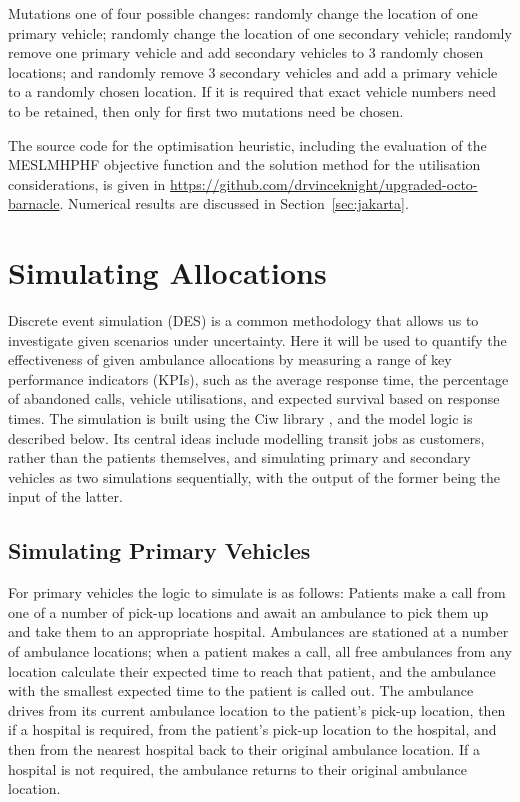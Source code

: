 \documentclass[preprint,12pt]{elsarticle}
\begin{document}
Mutations one of four possible changes: randomly change the location of one
primary vehicle; randomly change the location of one secondary vehicle;
randomly remove one primary vehicle and add secondary vehicles to 3 randomly
chosen locations; and randomly remove 3 secondary vehicles and add a primary
vehicle to a randomly chosen location. If it is required that exact vehicle
numbers need to be retained, then only for first two mutations need be chosen.

The source code for the optimisation heuristic, including the evaluation of
the MESLMHPHF objective function and the solution method for the utilisation
considerations, is given in
\url{https://github.com/drvinceknight/upgraded-octo-barnacle}.
Numerical results are discussed in Section~\ref{sec:jakarta}.




\section{Simulating Allocations}\label{sec:simulation}
Discrete event simulation (DES) is a common methodology that allows us to
investigate given scenarios under uncertainty. Here it will be used to
quantify the effectiveness of given ambulance allocations by measuring a range
of key performance indicators (KPIs), such as the average response time, the
percentage of abandoned calls, vehicle utilisations, and expected survival
based on response times. The simulation is built using the Ciw library
\cite{palmer2019ciw}, and the model logic is described below. Its central
ideas include modelling transit jobs as customers, rather than the patients
themselves, and simulating primary and secondary vehicles as two simulations
sequentially, with the output of the former being the input of the latter.


\subsection{Simulating Primary Vehicles}\label{sec:simulation_primary}
For primary vehicles the logic to simulate is as follows: Patients make a call
from one of a number of pick-up locations and await an ambulance to pick them
up and take them to an appropriate hospital. Ambulances are stationed at a
number of ambulance locations; when a patient makes a call, all free
ambulances from any location calculate their expected time to reach that
patient, and the ambulance with the smallest expected time to the patient is
called out. The ambulance drives from its current ambulance location to the
patient's pick-up location, then if a hospital is required, from the patient's
pick-up location to the hospital, and then from the nearest hospital back to
their original ambulance location. If a hospital is not required, the
ambulance returns to their original ambulance location.
\end{document}
